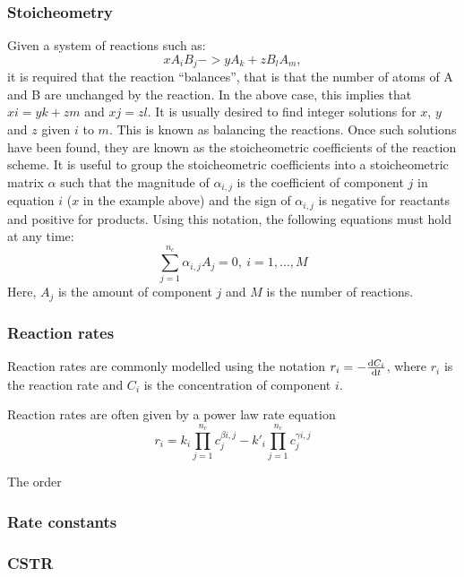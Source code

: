 \subsubsection{Stoicheometry}
Given a system of reactions such as:
\begin{equation}
  xA_iB_j -> yA_k + zB_lA_m,
\end{equation}
it is required that the reaction ``balances'', that is that the number
of atoms of A and B are unchanged by the reaction.  In the above case,
this implies that $xi=yk+zm$ and $xj=zl$.  It is usually desired to
find integer solutions for $x$, $y$ and $z$ given $i$ to $m$.  This is
known as balancing the reactions.  Once such solutions have been
found, they are known as the stoicheometric coefficients of the
reaction scheme.  It is useful to group the stoicheometric
coefficients into a stoicheometric matrix $\alpha$ such that the
magnitude of $\alpha_{i,j}$ is the coefficient of component $j$ in
equation $i$ ($x$ in the example above) and the sign of $\alpha_{i,j}$
is negative for reactants and positive for products.  Using this
notation, the following equations must hold at any time:
\begin{equation}
  \sum_{j=1}^{n_c} \alpha_{i,j}A_j = 0,~i=1,\dots,M
\end{equation}
Here, $A_j$ is the amount of component $j$ and $M$ is the  number
of reactions.

\subsubsection{Reaction rates}
Reaction rates are commonly modelled using the notation
$r_i=-\frac{\mathrm{d} C_i}{\mathrm{d} t}$, where $r_i$ is the reaction rate and $C_i$ is the
concentration of component $i$.  

Reaction rates are often given by a power law rate equation
\begin{equation}
  r_i = k_i \prod_{j=1}^{n_c}c_j^{\beta{i,j}} - k'_i\prod_{j=1}^{n_c}c_j^{\gamma{i,j}}
\end{equation}

The order 

\subsubsection{Rate constants}

\subsubsection{CSTR}

